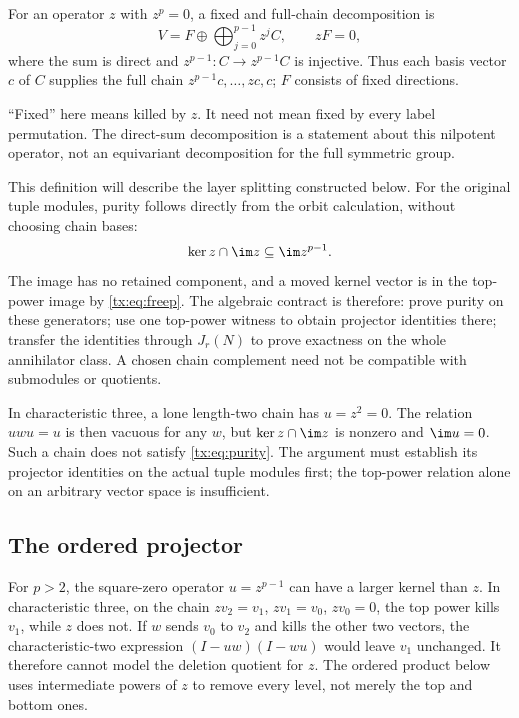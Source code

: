 \begin{definition}\label{tx:def:full-chains}
For an operator $z$ with $z^p=0$, a fixed and full-chain decomposition is
\[
             V=F\oplus\bigoplus_{j=0}^{p-1}z^jC,
             \qquad zF=0,
\]
where the sum is direct and $z^{p-1}:C\to z^{p-1}C$ is injective.
Thus each basis vector $c$ of $C$ supplies the full chain
$z^{p-1}c,\ldots,zc,c$; $F$ consists of fixed directions.
\end{definition}
``Fixed'' here means killed by $z$. It need not mean fixed by every
label permutation. The direct-sum decomposition is a statement about
this nilpotent operator, not an equivariant decomposition for the
full symmetric group.

This definition will describe the layer splitting constructed below.
For the original tuple modules, purity follows directly from the orbit
calculation, without choosing chain bases:
\begin{equation}\label{tx:eq:purity}\ker z\cap\im z\subseteq\im z^{p-1}.
\end{equation}
The image has no retained component, and a moved kernel vector is in
the top-power image by \eqref{tx:eq:freep}. The algebraic contract is
therefore: prove purity on these generators; use one top-power witness
to obtain projector identities there; transfer the identities through
$J_r(N)$ to prove exactness on the whole annihilator class. A chosen
chain complement need not be compatible with submodules or quotients.

\begin{example}
In characteristic three, a lone length-two chain has $u=z^2=0$. The relation $uwu=u$ is then vacuous for any $w$, but $\ker z\cap\im z$ is nonzero and $\im u=0$. Such a chain does not satisfy \eqref{tx:eq:purity}. The argument must establish its projector identities on the actual tuple modules first; the top-power relation alone on an arbitrary vector space is insufficient.
\end{example}

\subsection{The ordered projector}
For $p>2$, the square-zero operator $u=z^{p-1}$ can have a larger
kernel than $z$. In characteristic three, on the chain $zv_2=v_1$,
$zv_1=v_0$, $zv_0=0$, the top power kills $v_1$, while $z$ does not. If $w$
sends $v_0$ to $v_2$ and kills the other two vectors, the
characteristic-two expression $(I-uw)(I-wu)$ would leave $v_1$
unchanged. It therefore cannot model the deletion quotient for $z$.
The ordered product below uses intermediate powers of $z$ to remove
every level, not merely the top and bottom ones.

